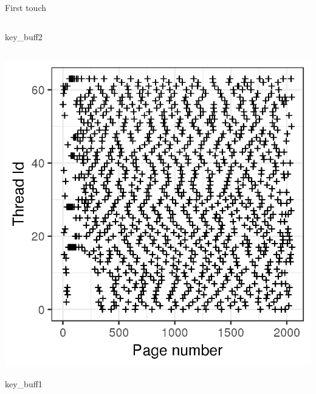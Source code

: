 \documentclass[xcolor={usenames,dvipsnames},hyperref={pdfusetitle}]{beamer}
\begin{document}
\begin{frame}{First touch}
{\begin{columns}
\begin{column}{.45\linewidth}
                \begin{block}{}
                    \centering
                    key\_buff2
                \end{block}
            \end{column}
        \end{columns}
    }{
        \centering
        \includegraphics[width=.6\linewidth]{tabarnac/is_b_kb1_ft.png}
        \begin{block}{}
            \centering
            key\_buff1
        \end{block}
    }
    \pause
\end{frame}
\end{document}
